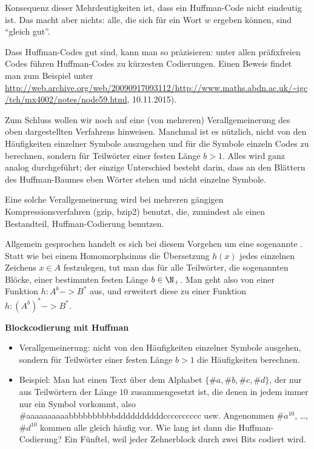 Konsequenz dieser Mehrdeutigkeiten ist, dass ein Huffman-Code nicht
eindeutig ist. 
% 
Das macht aber nichts: alle, die sich für ein Wort $w$ ergeben können,
sind "`gleich gut"'.

Dass Huffman-Codes gut sind, kann man so präzisieren: unter allen
präfixfreien Codes führen Huffman-Codes zu kürzesten
Codierungen. 
% 
Einen Beweis findet man zum Beispiel unter
\url{http://web.archive.org/web/20090917093112/http://www.maths.abdn.ac.uk/~igc/tch/mx4002/notes/node59.html},
10.11.2015).

Zum Schluss wollen wir noch auf eine (von mehreren) Verallgemeinerung
des oben dargestellten Verfahrens hinweisen. 
% 
Manchmal ist es nützlich, nicht von den Häufigkeiten einzelner Symbole
auszugehen und für die Symbole einzeln Codes zu berechnen, sondern für
Teilwörter einer festen Länge $b>1$.
% 
Alles wird ganz analog durchgeführt; der einzige Unterschied besteht
darin, dass an den Blättern des Huffman-Baumes eben Wörter stehen und
nicht einzelne Symbole.

Eine solche Verallgemeinerung wird bei mehreren gängigen
Kompressionsverfahren (\zB gzip, bzip2) benutzt, die, zumindest als
einen Bestandteil, Huffman-Codierung benutzen.

Allgemein gesprochen handelt es sich bei diesem Vorgehen um eine
sogenannte . 
% 
Statt wie bei einem Homomorphsimus die Übersetzung $h(x)$ jedes
einzelnen Zeichens $x\in A$ festzulegen, tut man das für alle
Teilwörter, die sogenannten Blöcke, einer bestimmten festen Länge
$b\in\N_+$.
% 
Man geht also von einer Funktion $h:A^b -> B^*$ aus, und erweitert
diese zu einer Funktion $h:(A^b)^* -> B^*$.

\begin{tutorium}
  \noindent\textbf{Blockcodierung mit Huffman}
  \begin{itemize}
  \item Verallgemeinerung: nicht von den Häufigkeiten einzelner
    Symbole ausgehen, sondern für Teilwörter einer festen Länge $b>1$
    die Häufigkeiten berechnen.
  \item Beispiel: Man hat einen Text über dem Alphabet $\{\#a, \#b,
    \#c, \#d\}$, der nur aus Teilwörtern der Länge $10$
    zusammengesetzt ist, die denen in jedem immer nur ein Symbol
    vorkommt, also \zB \#{aaaaaaaaaabbbbbbbbbbddddddddddcccccccccc}
    usw. Angenommen $\#a^{10}$, \dots, $\#d^{10}$ kommen alle gleich
    häufig vor. Wie lang ist dann die Huffman-Codierung?  Ein Fünftel,
    weil jeder Zehnerblock durch zwei Bits codiert wird.
  \end{itemize}
\end{tutorium}
